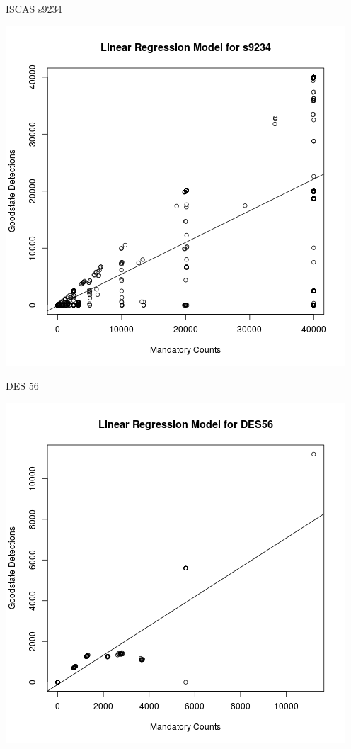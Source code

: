 \documentclass{beamer}
\begin{document}
\begin{frame}{ISCAS s9234}
\begin{center}
    \includegraphics[scale=0.40]{Images/s9234linereg.png}
\end{center}
\end{frame}

\begin{frame}{DES 56}
\begin{center}
    \includegraphics[scale=0.40]{Images/deslinereg.png}
\end{center}
\end{frame}
\end{document}
